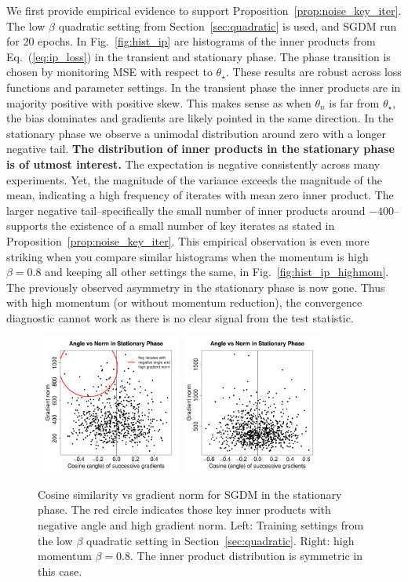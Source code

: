 \documentclass[conference]{IEEEtran}
\begin{document}
We first provide empirical evidence to support Proposition~\ref{prop:noise_key_iter}.  
The low $\beta$ quadratic setting from Section~\ref{sec:quadratic} is used, and SGDM run for 20 epochs. 
In Fig.~\ref{fig:hist_ip} are histograms of the inner products from Eq.~(\ref{eq:ip_loss}) in the transient and stationary phase. The phase transition is chosen by monitoring MSE with respect to $\theta_\star$.
These results are robust across loss functions and parameter settings. 
In the transient phase the inner products are in majority positive with positive skew. 
This makes sense as when $\theta_n$ is far from $\theta_\star$, the bias dominates and gradients are likely pointed in the same direction. 
In the stationary phase we observe a unimodal distribution around zero with a longer negative tail.
\textbf{The distribution of inner products in the stationary phase is of utmost interest.}
The expectation is negative consistently across many experiments. 
Yet, the magnitude of the variance exceeds the magnitude of the mean, indicating a high frequency of iterates with mean zero inner product.
The larger negative tail--specifically the small number of inner products around $-400$--supports the existence of a small number of key iterates as stated in Proposition~\ref{prop:noise_key_iter}.
This empirical observation is even more striking when you compare similar histograms when the momentum is high $\beta = 0.8$ and keeping all other settings the same, in Fig.~\ref{fig:hist_ip_highmom}.
The previously observed asymmetry in the stationary phase is now gone.
Thus with high momentum (or without momentum reduction), the convergence diagnostic cannot work as there is no clear signal from the test statistic.
\begin{figure}[ht]
\mbox{
  \includegraphics[width=1.8in]{fig/4-2_AngleNorm.pdf}\hspace{-0.12in}
  \includegraphics[width=1.8in]{fig/RFig7_HMAN.pdf}
}
\vspace{-0.2in}
  \caption{Cosine similarity vs gradient norm for SGDM in the stationary phase.
  The red circle indicates those key inner products with negative angle and high gradient norm.
  Left: Training settings from the low $\beta$ quadratic setting in Section~\ref{sec:quadratic}.
  Right: high momentum $\beta = 0.8$.
  The inner product distribution is symmetric in this case. 
  }
  \label{fig:angle_norm}
\end{figure}
\end{document}

